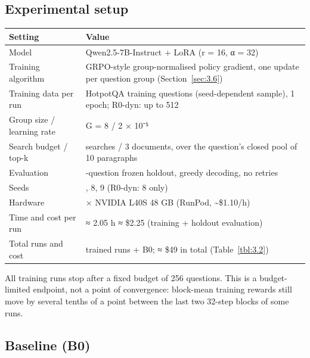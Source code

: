 \subsection{Experimental setup}\label{sec:4.1}

{\def\LTcaptype{none} %
\begin{longtable}[]{@{}
  >{\raggedright\arraybackslash}p{}
  >{\raggedright\arraybackslash}p{}@{}}
\toprule\noalign{}
\begin{minipage}[b]{\linewidth}\raggedright
Setting
\end{minipage} & \begin{minipage}[b]{\linewidth}\raggedright
Value
\end{minipage} \\
\midrule\noalign{}
\endhead
\bottomrule\noalign{}
\endlastfoot
Model & Qwen2.5-7B-Instruct + LoRA (r = 16, α = 32) \\
Training algorithm & GRPO-style group-normalised policy gradient, one
update per question group (Section~\ref{sec:3.6}) \\
Training data per run & 256 HotpotQA training questions (seed-dependent
sample), 1 epoch; R0-dyn: up to 512 \\
Group size / learning rate & G = 8 / 2 × 10⁻⁵ \\
Search budget / top-k & 3 searches / 3 documents, over the question's
closed pool of 10 paragraphs \\
Evaluation & 300-question frozen holdout, greedy decoding, no retries \\
Seeds & 7, 8, 9 (R0-dyn: 8 only) \\
Hardware & 1 × NVIDIA L40S 48 GB (RunPod, \textasciitilde\$1.10/h) \\
Time and cost per run & ≈ 2.05 h ≈ \$2.25 (training + holdout
evaluation) \\
Total runs and cost & 16 trained runs + B0; ≈ \$49 in total
(Table~\ref{tbl:3.2}) \\
\end{longtable}
}

All training runs stop after a fixed budget of 256 questions. This is a
budget-limited endpoint, not a point of convergence: block-mean training
rewards still move by several tenths of a point between the last two
32-step blocks of some runs.

\subsection{Baseline (B0)}\label{sec:4.2}

